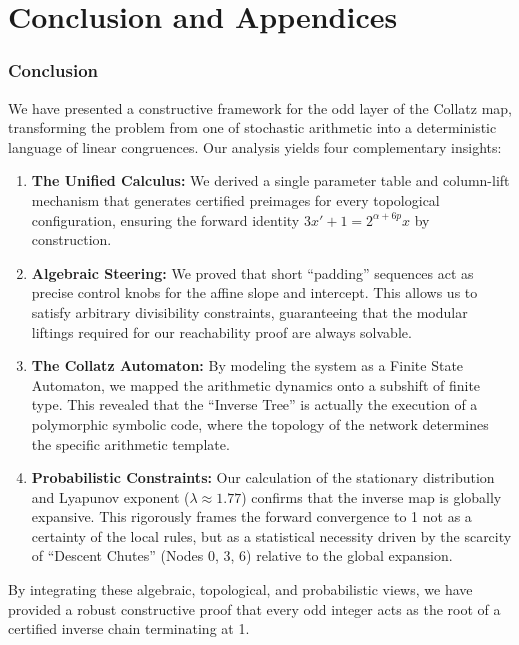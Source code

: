 \documentclass[11pt,letterpaper]{amsart}
\theoremstyle{definition}
\theoremstyle{plain}
\theoremstyle{plain}
\theoremstyle{remark}
\begin{document}
\part{Conclusion and Appendices}

\section{Conclusion}
\label{sec:conclusion}

We have presented a constructive framework for the odd layer of the Collatz map, transforming the problem from one of stochastic arithmetic into a deterministic language of linear congruences. Our analysis yields four complementary insights:

\begin{enumerate}
    \item \textbf{The Unified Calculus:} We derived a single parameter table and column-lift mechanism that generates certified preimages for every topological configuration, ensuring the forward identity $3x'+1 = 2^{\alpha+6p}x$ by construction.
    \item \textbf{Algebraic Steering:} We proved that short ``padding'' sequences act as precise control knobs for the affine slope and intercept. This allows us to satisfy arbitrary divisibility constraints, guaranteeing that the modular liftings required for our reachability proof are always solvable.
    \item \textbf{The Collatz Automaton:} By modeling the system as a Finite State Automaton, we mapped the arithmetic dynamics onto a subshift of finite type. This revealed that the ``Inverse Tree'' is actually the execution of a polymorphic symbolic code, where the topology of the network determines the specific arithmetic template.
    \item \textbf{Probabilistic Constraints:} Our calculation of the stationary distribution and Lyapunov exponent ($\lambda \approx 1.77$) confirms that the inverse map is globally expansive. This rigorously frames the forward convergence to 1 not as a certainty of the local rules, but as a statistical necessity driven by the scarcity of ``Descent Chutes'' (Nodes 0, 3, 6) relative to the global expansion.
\end{enumerate}

By integrating these algebraic, topological, and probabilistic views, we have provided a robust constructive proof that every odd integer acts as the root of a certified inverse chain terminating at 1.
\end{document}
